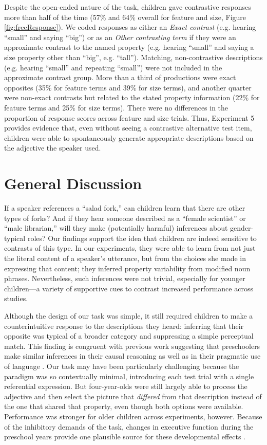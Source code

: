 \documentclass[man]{apa2}
\begin{document}
Despite the open-ended nature of the task, children gave contrastive responses more than half of the time (57\% and 64\% overall for feature and size, Figure \ref{fig:freeResponse}).  We coded responses as either an \emph{Exact contrast} (e.g. hearing ``small'' and saying ``big'') or as an \emph{Other contrasting term} if they were an approximate contrast to the named property (e.g. hearing ``small'' and saying a size property other than ``big'', e.g. ``tall''). Matching, non-contrastive descriptions (e.g. hearing ``small'' and repeating ``small'') were not included in the approximate contrast group. More than a third of productions were exact opposites (35\% for feature terms and 39\% for size terms), and another quarter were non-exact contrasts but related to the stated property information (22\% for feature terms and 25\% for size terms). There were no differences in the proportion of response scores across feature and size trials. Thus, Experiment 5 provides evidence that, even without seeing a contrastive alternative test item, children were able to spontaneously generate appropriate descriptions based on the adjective the speaker used. 

\section{General Discussion}

If a speaker references a ``salad fork,'' can children learn that there are other types of forks? And if they hear someone described as a ``female scientist'' or ``male librarian,'' will they make (potentially harmful) inferences about gender-typical roles? Our findings support the idea that children are indeed sensitive to contrasts of this type. In our experiments, they were able to learn from not just the literal content of a speaker's utterance, but from the choices she made in expressing that content; they inferred property variability from modified noun phrases. Nevertheless, such inferences were not trivial, especially for younger children---a variety of supportive cues to contrast increased performance across studies.

Although the design of our task was simple, it still required children to make a counterintuitive response to the descriptions they heard: inferring that their opposite was typical of a broader category and suppressing a simple perceptual match. This finding is congruent with previous work suggesting that preschoolers make similar inferences in their causal reasoning \cite{harris1996} as well as in their pragmatic use of language \cite{barner2011,stiller2014}. Our task may have been particularly challenging because the paradigm was so contextually minimal, introducing each test trial with a single referential expression. But four-year-olds were still largely able to process the adjective and then select the picture that \emph{differed} from that description instead of the one that shared that property, even though both options were available. Performance was stronger for older children across experiments, however. Because of the inhibitory demands of the task, changes in executive function during the preschool years provide one plausible source for these developmental effects \cite{davidson2006,zelazo2003}. 
\end{document}
